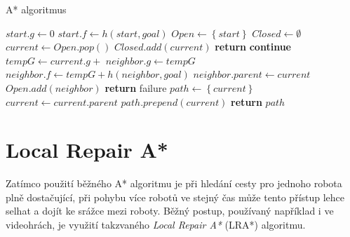 %

\begin{algorithm}[H]
	\caption{A* algoritmus}
	\label{alg:Astar}
	\begin{algorithmic}[1]
		\State $start.g\gets 0$
		\State $start.f\gets h(start,goal)$
		\State $Open\gets \left\{start\right\}$
		\State $Closed\gets \emptyset$
		\State $current\gets Open.pop()$
		\State $Closed.add(current)$
		\State \textbf{return} 
		\EndIf
		\State \textbf{continue}
		\EndIf
		\State $tempG\gets current.g+$
		\State $neighbor.g\gets tempG$
		\State $neighbor.f\gets tempG+h(neighbor,goal)$
		\State $neighbor.parent\gets current$
		\State $Open.add(neighbor)$
		\EndIf
		\EndIf
		\EndFor
		\EndWhile
		\State \textbf{return} failure
		\EndFunction
		\Statex
		\State $path\gets\left\{current\right\}$
		\State $current\gets current.parent$
		\State $path.prepend(current)$
		\EndWhile
		\State \textbf{return} $path$
		\EndFunction
	\end{algorithmic}
\end{algorithm}

\clearpage
\section{Local Repair A*}
Zatímco použití běžného A* algoritmu je při hledání cesty pro jednoho robota plně dostačující, při pohybu více robotů ve stejný čas může tento přístup lehce selhat a dojít ke srážce mezi roboty. Běžný postup, používaný například i ve videohrách, je využití takzvaného \emph{Local Repair A*} (LRA*) algoritmu.

